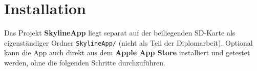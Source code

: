 \chapter{Installation}\label{chapter:installation}
Das Projekt \textbf{SkylineApp} liegt separat auf der beiliegenden SD-Karte als eigenständiger Ordner \texttt{SkylineApp/} (nicht als Teil der Diplomarbeit).
Optional kann die App auch direkt aus dem \textbf{Apple App Store} installiert und getestet werden,
ohne die folgenden Schritte durchzuführen.



